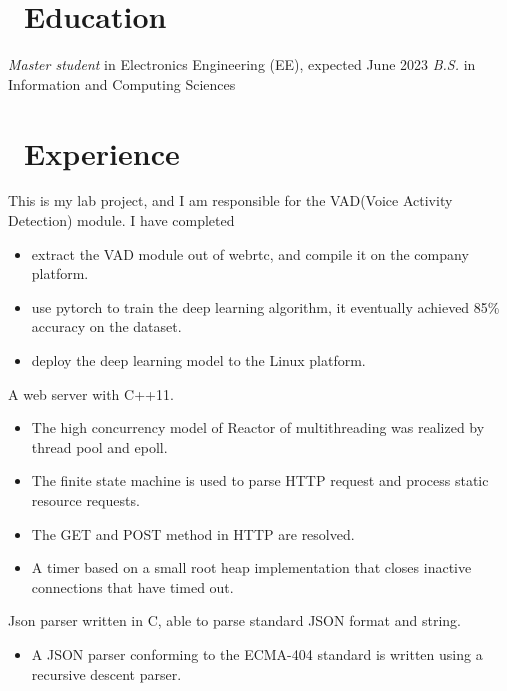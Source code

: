 \documentclass{resume}
\begin{document}



\section{\faGraduationCap\ Education}
\textit{Master student} in Electronics Engineering (EE), expected June 2023
\textit{B.S.} in Information and Computing Sciences

\section{\faUsers\ Experience}
\role{Intern}{Lab Project}
This is my lab project, and I am responsible for the VAD(Voice Activity Detection) module. I have completed
\begin{itemize}
    \item extract the VAD module out of webrtc, and compile it on the company platform.
    \item use pytorch to train the deep learning algorithm, it eventually achieved 85\% accuracy on the dataset.
    \item deploy the deep learning model to the Linux platform.
\end{itemize}

A web server with C++11.
\begin{itemize}
    \item The high concurrency model of Reactor of multithreading was realized by thread pool and epoll.
    \item The finite state machine is used to parse HTTP request and process static resource requests.
    \item The GET and POST method in HTTP are resolved.
    \item A timer based on a small root heap implementation that closes inactive connections that have timed out.
\end{itemize}

Json parser written in C, able to parse standard JSON format and string.
\begin{itemize}
    \item A JSON parser conforming to the ECMA-404 standard is written using a recursive descent parser.
\end{itemize}
\end{document}
